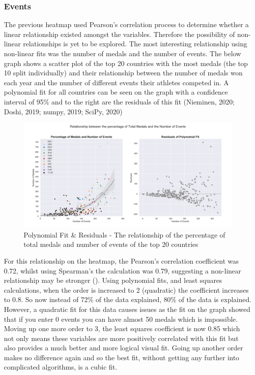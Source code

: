 \documentclass[a4 paper, 12pt]{article}
\begin{document}
        \subsubsection{Events}
        The previous heatmap used Pearson's correlation process to determine whether a linear relationship existed amongst the variables. Therefore the possibility of non-linear relationships is yet to be explored. The most interesting relationship using non-linear fits was the number of medals and the number of events. The below graph shows a scatter plot of the top 20 countries with the most medals (the top 10 split individually) and their relationship between the number of medals won each year and the number of different events their athletes competed in. A polynomial fit for all countries can be seen on the graph with a confidence interval of 95\% and to the right are the residuals of this fit (Nieminen, 2020; Doshi, 2019; numpy, 2019; SciPy, 2020)

        \begin{figure} [H]
            \centering
            \includegraphics[width=\textwidth, frame]
                {./images/graph/countries_medals_resid.png}      
                \caption{Polynomial Fit \& Residuals - The relationship of the percentage of total medals and number of events of the top 20 countries} 
        \end{figure}
        For this relationship on the heatmap, the Pearson's correlation coefficient was 0.72, whilst using Spearman's the calculation was 0.79, suggesting a non-linear relationship may be stronger (). Using polynomial fits, and least squares calculations, when the order is increased to 2 (quadratic) the coefficient increases to 0.8. So now instead of 72\% of the data explained, 80\% of the data is explained. However, a quadratic fit for this data causes issues as the fit on the graph showed that if you enter 0 events you can have almost 50 medals which is impossible. Moving up one more order to 3, the least squares coefficient is now 0.85 which not only means these variables are more positively correlated with this fit but also provides a much better and more logical visual fit. Going up another order makes no difference again and so the best fit, without getting any further into complicated algorithms, is a cubic fit. 
\end{document}
